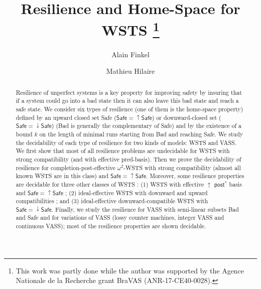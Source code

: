 \documentclass[runningheads]{llncs}
\newcommand{\post}{\textsf{post}}
\newcommand{\Safe}{\textsf{Safe}}
\begin{document}
%
\title{Resilience and Home-Space for WSTS \thanks{This work was partly done while the author was supported by the Agence Nationale de la Recherche grant BraVAS (ANR-17-CE40-0028).}} 
%
%
\author{Alain Finkel \and Mathieu Hilaire}
%
%
%
\maketitle              %
%





\begin{abstract}
\noindent
Resilience of unperfect systems is a key property for improving safety by insuring that if a system could go into a bad state then it can also leave this bad state and reach a safe state.
We consider six types of resilience (one of them is the home-space property) defined by an upward closed set Safe  ($\Safe=\uparrow \Safe$) or downward-closed set ($\Safe=\downarrow \Safe$) (Bad is generally the complementary of Safe) and by the existence of a bound $k$ on the length of minimal runs starting from Bad and reaching Safe. We study the decidability of each type of resilience for two kinds of models: WSTS and VASS. We first show that most of all resilience problems are undecidable for WSTS with strong compatibility (and with effective pred-basis). Then we prove the decidability of resilience for completion-post-effective $\omega^2$-WSTS with strong compatibility (almost all known WSTS are in this class) and $\Safe = \uparrow \Safe$. Moreover, some resilience properties are decidable for three other classes of WSTS : (1) WSTS with effective 
$\uparrow$ $\post^*$ basis and $\Safe=\uparrow \Safe$ ; (2) ideal-effective WSTS with downward and upward compatibilities ; and (3) ideal-effective downward-compatible WSTS with $\Safe=\downarrow \Safe$. Finally, we study the resilience for VASS with semi-linear subsets Bad and Safe and for variations of VASS (lossy counter machines, integer VASS and continuous VASS); most of the resilience properties are shown decidable.
\end{abstract}
\end{document}
